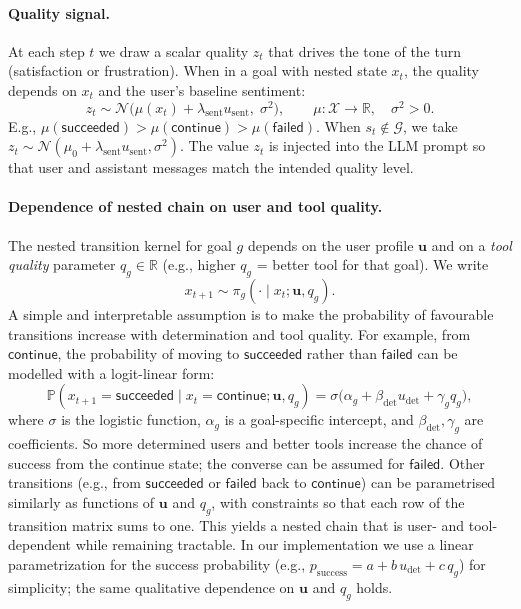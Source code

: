 \paragraph{Quality signal.}
At each step $t$ we draw a scalar quality $z_t$ that drives the tone of the turn (satisfaction or frustration). When in a goal with nested state $x_t$, the quality depends on $x_t$ and the user's baseline sentiment:
\begin{equation}
  z_t \sim \mathcal{N}\bigl(\mu(x_t) + \lambda_{\mathrm{sent}} u_{\mathrm{sent}},\; \sigma^2\bigr), \qquad \mu \colon \mathcal{X} \to \mathbb{R}, \quad \sigma^2 > 0. \label{eq:quality}
\end{equation}
E.g., $\mu(\mathsf{succeeded}) > \mu(\mathsf{continue}) > \mu(\mathsf{failed})$. When $s_t \notin \mathcal{G}$, we take $z_t \sim \mathcal{N}(\mu_0 + \lambda_{\mathrm{sent}} u_{\mathrm{sent}}, \sigma^2)$. The value $z_t$ is injected into the LLM prompt so that user and assistant messages match the intended quality level.

\paragraph{Dependence of nested chain on user and tool quality.}
The nested transition kernel for goal $g$ depends on the user profile $\mathbf{u}$ and on a \emph{tool quality} parameter $q_g \in \mathbb{R}$ (e.g., higher $q_g$ = better tool for that goal). We write
\begin{equation}
  x_{t+1} \sim \pi_g(\cdot \mid x_t; \mathbf{u}, q_g). \label{eq:nested-user-tool}
\end{equation}
A simple and interpretable assumption is to make the probability of favourable transitions increase with determination and tool quality. For example, from $\mathsf{continue}$, the probability of moving to $\mathsf{succeeded}$ rather than $\mathsf{failed}$ can be modelled with a logit-linear form:
\begin{equation}
  \mathbb{P}(x_{t+1} = \mathsf{succeeded} \mid x_t = \mathsf{continue}; \mathbf{u}, q_g) = \sigma\bigl(\alpha_g + \beta_{\mathrm{det}} u_{\mathrm{det}} + \gamma_g q_g\bigr), \label{eq:nested-logit}
\end{equation}
where $\sigma$ is the logistic function, $\alpha_g$ is a goal-specific intercept, and $\beta_{\mathrm{det}}, \gamma_g$ are coefficients. So more determined users and better tools increase the chance of success from the continue state; the converse can be assumed for $\mathsf{failed}$. Other transitions (e.g., from $\mathsf{succeeded}$ or $\mathsf{failed}$ back to $\mathsf{continue}$) can be parametrised similarly as functions of $\mathbf{u}$ and $q_g$, with constraints so that each row of the transition matrix sums to one. This yields a nested chain that is user- and tool-dependent while remaining tractable. In our implementation we use a linear parametrization for the success probability (e.g., $p_{\mathrm{success}} = a + b\, u_{\mathrm{det}} + c\, q_g$) for simplicity; the same qualitative dependence on $\mathbf{u}$ and $q_g$ holds.

